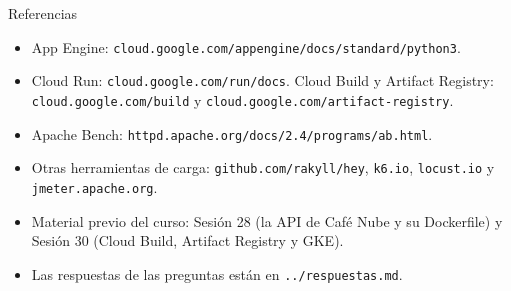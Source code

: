 \documentclass[aspectratio=169,10pt,c]{beamer}
\begin{document}
\begin{frame}{Referencias}
\scriptsize
\begin{itemize}\setlength\itemsep{4pt}
  \item App Engine: \texttt{cloud.google.com/appengine/docs/standard/python3}.
  \item Cloud Run: \texttt{cloud.google.com/run/docs}. Cloud Build y Artifact Registry: \texttt{cloud.google.com/build} y \texttt{cloud.google.com/artifact-registry}.
  \item Apache Bench: \texttt{httpd.apache.org/docs/2.4/programs/ab.html}.
  \item Otras herramientas de carga: \texttt{github.com/rakyll/hey}, \texttt{k6.io}, \texttt{locust.io} y \texttt{jmeter.apache.org}.
  \item Material previo del curso: Sesión 28 (la API de Café Nube y su Dockerfile) y Sesión 30 (Cloud Build, Artifact Registry y GKE).
  \item Las respuestas de las preguntas están en \texttt{../respuestas.md}.
\end{itemize}
\end{frame}
\end{document}
